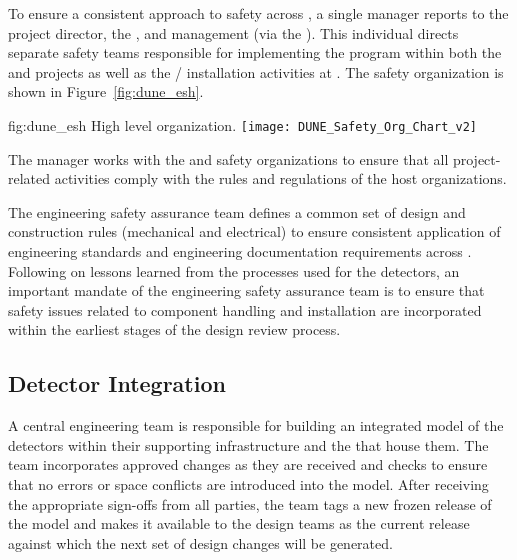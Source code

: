 To ensure a consistent approach to safety across ,
a single   manager reports 
to the  project director, the , and 
management (via the  ).  This individual
directs separate safety teams responsible for implementing the
  program within both the  
and  projects as well as the /
installation activities at . The safety organization 
is shown in Figure~\ref{fig:dune_esh}.

\begin{dunefigure}{fig:dune_esh}
  {High level   organization.}
  \texttt{[image: DUNE\_Safety\_Org\_Chart\_v2]}
\end{dunefigure}
The   manager works with the  
and  safety organizations to ensure that all project-related 
activities comply with the rules and regulations of the host 
organizations.  

The  engineering safety assurance team defines a common 
set of design and construction rules (mechanical and electrical) to 
ensure consistent application of engineering standards and engineering 
documentation requirements across .  
Following on lessons learned from the processes used for the 
 detectors, an important mandate of the engineering 
safety assurance team is to ensure that safety issues related to 
component handling and installation are incorporated within the 
earliest stages of the design review process.  

\subsection{%
Detector Integration}   
\label{sec:dune_engineering}


A central  engineering team is responsible for building 
an integrated model of the detectors within their supporting
infrastructure and the  that house them.  The  team incorporates approved changes as they 
are received and checks to ensure that no errors or space conflicts 
are introduced into the model.    After receiving the appropriate sign-offs from all 
parties, the  team tags a new frozen release of the model 
and makes it available to the design teams as the current release 
against which the next set of design changes will be generated.


